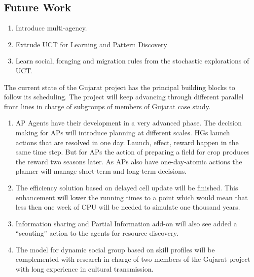 \documentclass[11pt,oneside,a4paper,openright]{report}
\begin{document}


\subsection{Future Work}

\begin{enumerate}

	\item Introduce multi-agency.
	
	\item Extrude UCT for Learning and Pattern Discovery	
	
	\item Learn social, foraging and migration rules from the stochastic explorations of UCT.
	
\end{enumerate}



The current state of the Gujarat project has the principal building blocks to follow its scheduling. 
The project will keep advancing through different parallel front lines in charge of subgroups of members of Gujarat case study. 
\begin{enumerate}

\item AP Agents have their development in a very advanced phase. The decision making for APs will introduce
planning at different scales. HGs launch actions that are resolved in one day. Launch, effect, reward
happen in the same time step. But for APs the action of preparing a field for crop produces the reward
two seasons later. As APs also have one-day-atomic actions the planner will manage short-term and long-term 
decisions.

\item The efficiency solution based on delayed cell update will be finished. This enhancement will lower the
running times to a point which would mean that less then one week of CPU will be needed to simulate one
thousand years.

\item Information sharing and Partial Information add-on will also see added a ``scouting'' action to the 
agents for resource discovery.

\item The model for dynamic social group based on skill profiles will be complemented with research in
charge of two members of the Gujarat project with long experience in cultural transmission.


\end{enumerate}
\end{document}
